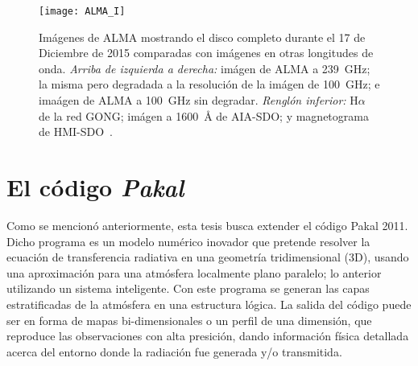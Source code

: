 \begin{figure}[ht]
\centering
\texttt{[image: ALMA\_I]}
\caption{Im\'agenes de ALMA mostrando el disco completo durante el 17 de Diciembre de 2015 comparadas con im\'agenes en otras longitudes de onda. \emph{Arriba de izquierda a derecha: }im\'agen de ALMA a 239~GHz; la misma pero degradada a la resoluci\'on de la im\'agen de 100~GHz; e ima\'agen de ALMA a 100~GHz sin degradar. \emph{Rengl\'on inferior: } H$\alpha$ de la red GONG; im\'agen a 1600~$\mbox{\AA}$ de AIA-SDO; y magnetograma de HMI-SDO~\citep{2017A&A...605A..78A}.}
\label{fig:chromosphericnet2}
\end{figure}





\section{El c\'odigo \emph{Pakal}}
Como se mencion\'o anteriormente, esta tesis busca extender el c\'odigo Pakal 2011\citep{Pakal}. Dicho programa es un modelo num\'erico inovador que pretende resolver la ecuaci\'on de transferencia radiativa en una geometr\'ia tridimensional (3D), usando una aproximaci\'on para una atm\'osfera localmente plano paralelo; lo anterior utilizando un sistema inteligente. Con este programa se generan las capas estratificadas de la atm\'osfera en una estructura l\'ogica. La salida del c\'odigo puede ser en forma de mapas bi-dimensionales o un perfil de una dimensi\'on, que reproduce las observaciones con alta presici\'on, dando informaci\'on f\'isica detallada acerca del entorno donde la radiaci\'on fue generada y/o transmitida.

